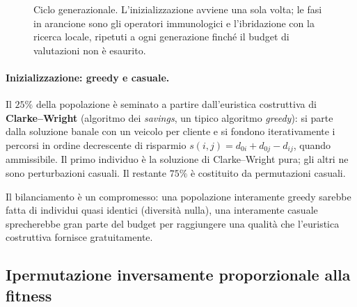 \documentclass[10pt,a4paper]{article}
\begin{document}
\begin{figure}[H]
\caption{Ciclo generazionale. L'inizializzazione avviene una sola volta; le fasi
in arancione sono gli operatori immunologici e l'ibridazione con la ricerca
locale, ripetuti a ogni generazione finché il budget di valutazioni non è
esaurito.}
\label{fig:pipeline}
\end{figure}

\paragraph{Inizializzazione: greedy e casuale.}
Il $25\%$ della popolazione è seminato a partire dall'euristica costruttiva di
\textbf{Clarke--Wright} (algoritmo dei \emph{savings}, un tipico algoritmo
\emph{greedy}): si parte dalla soluzione banale con un veicolo per cliente e si
fondono iterativamente i percorsi in ordine decrescente di risparmio
$s(i,j)=d_{0i}+d_{0j}-d_{ij}$, quando ammissibile. Il primo individuo è la
soluzione di Clarke--Wright pura; gli altri ne sono perturbazioni casuali. Il
restante $75\%$ è costituito da permutazioni casuali.

Il bilanciamento è un compromesso: una popolazione interamente greedy sarebbe fatta
di individui quasi identici (diversità nulla), una interamente casuale sprecherebbe
gran parte del budget per raggiungere una qualità che l'euristica costruttiva
fornisce gratuitamente.

\subsection{Ipermutazione inversamente proporzionale alla fitness}
\end{document}
